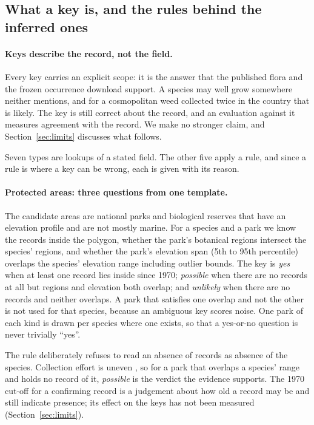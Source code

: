 \documentclass[11pt,a4paper]{article}
\begin{document}
\subsection{What a key is, and the rules behind the inferred ones}\label{sec:keys}

\paragraph{Keys describe the record, not the field.} Every key carries an explicit
scope: it is the answer that the published flora and the frozen occurrence download
support. A species may well grow somewhere neither mentions, and for a cosmopolitan
weed collected twice in the country that is likely. The key is still correct about
the record, and an evaluation against it measures agreement with the record. We make
no stronger claim, and Section~\ref{sec:limits} discusses what follows.

Seven types are lookups of a stated field. The other five apply a rule, and since a
rule is where a key can be wrong, each is given with its reason.

\paragraph{Protected areas: three questions from one template.} The candidate areas
are national parks and biological reserves that have an elevation profile and are not
mostly marine. For a species and a park we know the records inside the polygon,
whether the park's botanical regions intersect the species' regions, and whether the
park's elevation span (5th to 95th percentile) overlaps the species' elevation range
including outlier bounds. The key is \emph{yes} when at least one record lies inside
since 1970; \emph{possible} when there are no records at all but regions and
elevation both overlap; and \emph{unlikely} when there are no records and neither
overlaps. A park that satisfies one overlap and not the other is not used for that
species, because an ambiguous key scores noise. One park of each kind is drawn per
species where one exists, so that a yes-or-no question is never trivially ``yes''.

The rule deliberately refuses to read an absence of records as absence of the
species. Collection effort is uneven \citep{beck2014spatial,
meyer2016multidimensional}, so for a park that overlaps a species' range and holds no
record of it, \emph{possible} is the verdict the evidence supports. The 1970 cut-off
for a confirming record is a judgement about how old a record may be and still
indicate presence; its effect on the keys has not been measured
(Section~\ref{sec:limits}).
\end{document}
